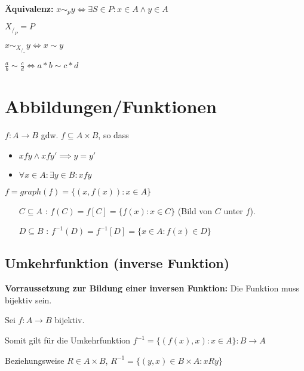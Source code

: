 \documentclass[12pt]{scrreprt}
\begin{document}
                \textbf{Äquivalenz:} $ x \sim _ p y \iff \exists S \in P : x \in A \land y \in A $

                $ X _ { / _ { P } } = P $

                $ x \sim _ { X _ { / _ { \sim } } } y \iff x \sim y $

                $ \frac{a}{b} \sim \frac{c}{d} \iff a * b \sim c * d $


        \section{Abbildungen/Funktionen}
            \label{s:grundbegriffe_funktionen}

            $ f : A \rightarrow B $ gdw. $ f \subseteq A \times B $, so dass
            \begin{itemize}
                \item $ xfy \land xfy' \implies y = y' $
                \item $ \forall x \in A : \exists y \in B : xfy $
            \end{itemize}

            $ f = graph(f) = \{ (x, f(x)) : x \in A \} $

            \begin{itemize}
                \item[$ C \subseteq A $] : $ f(C) = f[C] = \{ f(x) : x \in C \} $ (Bild von $ C $ unter $ f $).
                \item[$ D \subseteq B $] : $ f ^ { -1 } (D) = f ^ { -1 } [D] = \{ x \in A : f(x) \in D \} $
            \end{itemize}

            \subsection{Umkehrfunktion (inverse Funktion)}
                \label{ss:grundbegriffe_funktionen_umkehr}

                \textbf{Vorraussetzung zur Bildung einer inversen Funktion:} Die Funktion muss bijektiv sein.

                Sei $ f : A \rightarrow B $ bijektiv.

                Somit gilt für die Umkehrfunktion $ f ^ { -1 } = \{ (f(x), x) : x \in A \} : B \rightarrow A $

                Beziehungsweise $ R \in A \times B $, $ R ^ { -1 } = \{ (y, x) \in B \times A : xRy \} $
\end{document}
